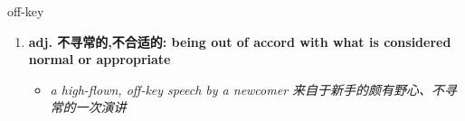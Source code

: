 
\begin{frame}
{\huge off-key}
\begin{center}
\begin{enumerate}\Large
  \item \textbf{adj. 不寻常的,不合适的: being out of accord with what is considered normal or appropriate}
  \begin{itemize}
    \item \em{\Large{a high-flown, off-key speech by a newcomer 来自于新手的颇有野心、不寻常的一次演讲}}
  \end{itemize}
\end{enumerate}
\end{center}
\end{frame}
